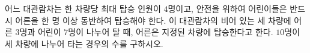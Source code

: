 \hspace*{2mm}\begin{minipage}[t]{\dimexpr\linewidth-2mm\relax}\vspace{0pt}
어느 대관람차는 한 차량당 최대 탑승 인원이 $4$명이고, 안전을 위하여 어린이들은 반드시 어른을 한 명 이상 동반하여 탑승해야 한다. 이 대관람차의 비어 있는 세 차량에 어른 $3$명과 어린이 $7$명이 나누어 탈 때, 어른은 지정된 차량에 탑승한다고 한다. $10$명이 세 차량에 나누어 타는 경우의 수를 구하시오.\end{minipage}
